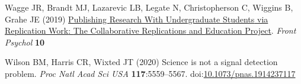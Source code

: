\documentclass[
  english,
  a4paper,
]{article}
\newlength{\cslhangindent}
\newlength{\cslentryspacingunit} %
\newenvironment{CSLReferences}[2] %
 {%
  \setlength{\parindent}{0pt}
  \ifodd #1
  \let\oldpar\par
  \def\par{\hangindent=\cslhangindent\oldpar}
  \fi
  \setlength{\parskip}{#2\cslentryspacingunit}
 }%
 {}
\begin{document}
\begin{CSLReferences}{1}{0}
\leavevmode{}%
Wagge JR, Brandt MJ, Lazarevic LB, Legate N, Christopherson C, Wiggins B, Grahe JE (2019) \href{https://www.frontiersin.org/articles/10.3389/fpsyg.2019.00247}{Publishing {Research With Undergraduate Students} via {Replication Work}: {The Collaborative Replications} and {Education Project}}. \emph{Front Psychol} \textbf{10}

\leavevmode{}%
Wilson BM, Harris CR, Wixted JT (2020) Science is not a signal detection problem. \emph{Proc Natl Acad Sci USA} \textbf{117}:5559--5567. doi:\href{https://doi.org/10.1073/pnas.1914237117}{10.1073/pnas.1914237117}

\end{CSLReferences}
\end{document}
